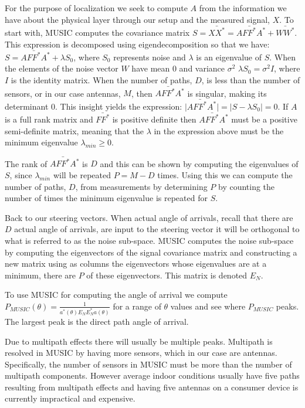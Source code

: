 \documentclass[12pt]{report}
\begin{document}
For the purpose of localization we seek to compute $A$ from the information we have about the physical layer through our setup and the measured signal, $X$. To start with, MUSIC computes the covariance matrix $S = \bar{XX^{*}} = A \bar{FF^{*}} A^{*} + \bar{WW^{*}}$. This expression is decomposed using eigendecomposition so that we have: $S = A \bar{FF^{*}} A^{*} + \lambda S_{0}$, where $S_{0}$ represents noise and $\lambda$ is an eigenvalue of $S$. When the elements of the noise vector $W$ have mean 0 and variance $\sigma^{2}$ $\lambda S_{0} = \sigma^{2} I$, where $I$ is the identity matrix. When the number of paths, $D$, is less than the number of sensors, or in our case antennas, $M$, then $A \bar{FF^{*}} A^{*}$ is singular, making its determinant 0. This insight yields the expression: $\lvert A \bar{FF^{*}} A^{*} \rvert = \lvert S - \lambda S_{0} \rvert = 0$. If $A$ is a full rank matrix and $\bar{FF^{*}}$ is positive definite then $A \bar{FF^{*}} A^{*}$ must be a positive semi-definite matrix, meaning that the $\lambda$ in the expression above must be the minimum eigenvalue $\lambda_{min} \geq 0$. \par

The rank of $A \bar{FF^{*}} A^{*}$ is $D$ and this can be shown by computing the eigenvalues of $S$, since $\lambda_{min}$ will be repeated $P = M - D$ times. Using this we can compute the number of paths, $D$, from measurements by determining $P$ by counting the number of times the minimum eigenvalue is repeated for $S$. \par

Back to our steering vectors. When actual angle of arrivals, recall that there are $D$ actual angle of arrivals, are input to the steering vector it will be orthogonal to what is referred to as the noise sub-space. MUSIC computes the noise sub-space by computing the eigenvectors of the signal covariance matrix and constructing a new matrix using as columns the eigenvectors whose eigenvalues are at a minimum, there are $P$ of these eigenvectors. This matrix is denoted $E_{N}$. 

To use MUSIC for computing the angle of arrival we compute $P_{MUSIC}(\theta) = \frac{1}{a^{*}(\theta) E_{N} E_{N}^{*} a(\theta)}$ for a range of $\theta$ values and see where $P_{MUSIC}$ peaks. The largest peak is the direct path angle of arrival. \par

Due to multipath effects there will usually be multiple peaks. Multipath is resolved in MUSIC by having more sensors, which in our case are antennas. Specifically, the number of sensors in MUSIC must be more than the number of multipath components. However average indoor conditions usually have five paths resulting from multipath effects and having five antennas on a consumer device is currently impractical and expensive. \par
\end{document}
